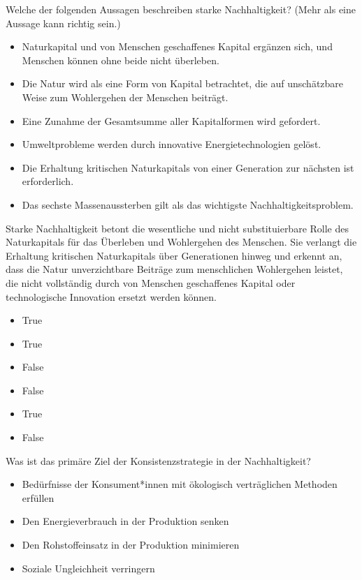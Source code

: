 \documentclass[
  nswissgerman,
  a4paper,
  openany]{book}
\providecommand{\tightlist}{%
  \setlength{\itemsep}{0pt}\setlength{\parskip}{0pt}}
\begin{document}
Welche der folgenden Aussagen beschreiben starke Nachhaltigkeit? (Mehr
als eine Aussage kann richtig sein.)

\begin{itemize}
\tightlist
\item[$\square$]
  Naturkapital und von Menschen geschaffenes Kapital ergänzen sich, und
  Menschen können ohne beide nicht überleben.
\item[$\square$]
  Die Natur wird als eine Form von Kapital betrachtet, die auf
  unschätzbare Weise zum Wohlergehen der Menschen beiträgt.
\item[$\square$]
  Eine Zunahme der Gesamtsumme aller Kapitalformen wird gefordert.
\item[$\square$]
  Umweltprobleme werden durch innovative Energietechnologien gelöst.
\item[$\square$]
  Die Erhaltung kritischen Naturkapitals von einer Generation zur
  nächsten ist erforderlich.
\item[$\square$]
  Das sechste Massenaussterben gilt als das wichtigste
  Nachhaltigkeitsproblem.
\end{itemize}

Starke Nachhaltigkeit betont die wesentliche und nicht substituierbare
Rolle des Naturkapitals für das Überleben und Wohlergehen des Menschen.
Sie verlangt die Erhaltung kritischen Naturkapitals über Generationen
hinweg und erkennt an, dass die Natur unverzichtbare Beiträge zum
menschlichen Wohlergehen leistet, die nicht vollständig durch von
Menschen geschaffenes Kapital oder technologische Innovation ersetzt
werden können.

\begin{itemize}
\tightlist
\item
  True
\item
  True
\item
  False
\item
  False
\item
  True
\item
  False
\end{itemize}

Was ist das primäre Ziel der Konsistenzstrategie in der Nachhaltigkeit?

\begin{itemize}
\tightlist
\item[$\square$]
  Bedürfnisse der Konsument*innen mit ökologisch verträglichen Methoden
  erfüllen
\item[$\square$]
  Den Energieverbrauch in der Produktion senken
\item[$\square$]
  Den Rohstoffeinsatz in der Produktion minimieren
\item[$\square$]
  Soziale Ungleichheit verringern
\end{itemize}
\end{document}
